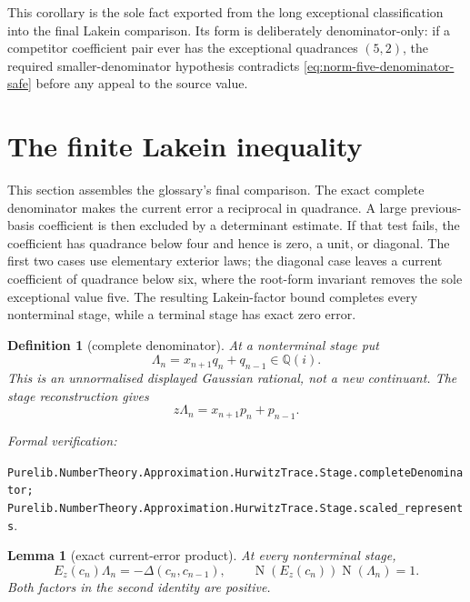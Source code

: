 \documentclass[11pt]{article}
\newtheorem{lemma}[lemma]{Lemma}
\newtheorem{definition}[definition]{Definition}
\newcommand{\Qi}{\mathbb{Q}(i)}
\newcommand{\Norm}[1]{\operatorname{N}\!\left(#1\right)}
\newcommand{\leanref}[1]{\par\smallskip\noindent
  \emph{Formal verification:}\par\nobreak
  {\raggedright\nolinkurl{#1}.\par}}
\begin{document}
This corollary is the sole fact exported from the long exceptional
classification into the final Lakein comparison.  Its form is deliberately
denominator-only: if a competitor coefficient pair ever has the exceptional
quadrances $(5,2)$, the required smaller-denominator hypothesis contradicts
\eqref{eq:norm-five-denominator-safe} before any appeal to the source value.

\section{The finite Lakein inequality}
\label{sec:lakein-proof}

This section assembles the glossary's final comparison.  The exact complete
denominator makes the current error a reciprocal in quadrance.  A large
previous-basis coefficient is then excluded by a determinant estimate.  If
that test fails, the coefficient has quadrance below four and hence is zero,
a unit, or diagonal.  The first two cases use elementary exterior laws; the
diagonal case leaves a current coefficient of quadrance below six, where the
root-form invariant removes the sole exceptional value five.  The resulting
Lakein-factor bound completes every nonterminal stage, while a terminal stage
has exact zero error.

\begin{definition}[complete denominator]
\label{def:complete-denominator}
At a nonterminal stage put
\begin{equation}
\label{eq:complete-denominator}
                    \Lambda_n=x_{n+1}q_n+q_{n-1}\in\Qi.
\end{equation}
This is an unnormalised displayed Gaussian rational, not a new continuant.
The stage reconstruction gives
\begin{equation}
\label{eq:complete-denominator-reconstruction}
                    z\Lambda_n=x_{n+1}p_n+p_{n-1}.
\end{equation}
\end{definition}

\leanref{Purelib.NumberTheory.Approximation.HurwitzTrace.Stage.completeDenominator;
Purelib.NumberTheory.Approximation.HurwitzTrace.Stage.scaled_represents}

\begin{lemma}[exact current-error product]
\label{lem:current-error-product}
At every nonterminal stage,
\begin{equation}
\label{eq:current-error-product}
 E_z(c_n)\Lambda_n=-\Delta(c_n,c_{n-1}),
 \qquad
 \Norm{E_z(c_n)}\Norm{\Lambda_n}=1.
\end{equation}
Both factors in the second identity are positive.
\end{lemma}
\end{document}
